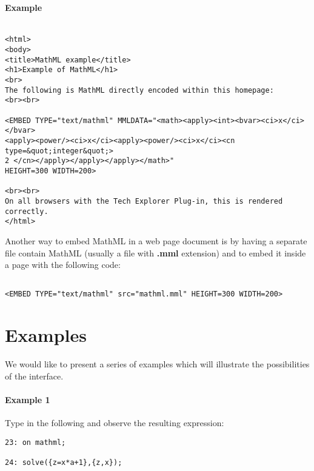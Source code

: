 \documentclass{article}
\begin{document}
\paragraph{Example}

\begin{verbatim} 

<html>
<body>
<title>MathML example</title>
<h1>Example of MathML</h1>
<br>
The following is MathML directly encoded within this homepage:
<br><br>

<EMBED TYPE="text/mathml" MMLDATA="<math><apply><int><bvar><ci>x</ci></bvar>
<apply><power/><ci>x</ci><apply><power/><ci>x</ci><cn type=&quot;integer&quot;>
2 </cn></apply></apply></apply></math>"
HEIGHT=300 WIDTH=200>

<br><br>
On all browsers with the Tech Explorer Plug-in, this is rendered
correctly.
</html>

\end{verbatim} 

Another way to embed MathML in a web page document is by having a
separate file contain MathML (usually a file with {\bf .mml} extension)
and to embed it inside a page with the following code:

\begin{verbatim} 

<EMBED TYPE="text/mathml" src="mathml.mml" HEIGHT=300 WIDTH=200>

\end{verbatim} 


\section{Examples}

We would like to present a series of examples which will illustrate the
possibilities of the interface.

\paragraph{Example 1} Type in the following and observe the resulting
expression:

\begin{verbatim}
23: on mathml;

24: solve({z=x*a+1},{z,x});
\end{verbatim}
\end{document}
